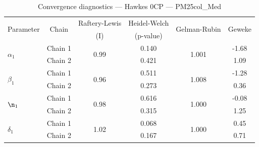 \begin{table}[H]
\centering
\caption{Convergence diagnostics — Hawkes 0CP — PM25col_Med}
\begin{tabular}{lccccc}
\toprule
\multirow{2}{*}{Parameter} & \multirow{2}{*}{Chain} & Raftery-Lewis & Heidel-Welch & \multirow{2}{*}{Gelman-Rubin} & \multirow{2}{*}{Geweke} \\
 & & (I) & (p-value) & & (z) \\
\midrule
\multirow{2}{*}{$\alpha_1$} & Chain 1 & \multirow{2}{*}{0.99} & 0.140 & \multirow{2}{*}{1.001} & -1.68 \\
 & Chain 2 & & 0.421 & & 1.09 \\
\midrule
\multirow{2}{*}{$\beta_1$} & Chain 1 & \multirow{2}{*}{0.96} & 0.511 & \multirow{2}{*}{1.008} & -1.28 \\
 & Chain 2 & & 0.273 & & 0.36 \\
\midrule
\multirow{2}{*}{$\n_1$} & Chain 1 & \multirow{2}{*}{0.98} & 0.616 & \multirow{2}{*}{1.000} & -0.08 \\
 & Chain 2 & & 0.315 & & 1.25 \\
\midrule
\multirow{2}{*}{$\delta_1$} & Chain 1 & \multirow{2}{*}{1.02} & 0.068 & \multirow{2}{*}{1.000} & 0.45 \\
 & Chain 2 & & 0.167 & & 0.71 \\
\bottomrule
\end{tabular}
\end{table}
